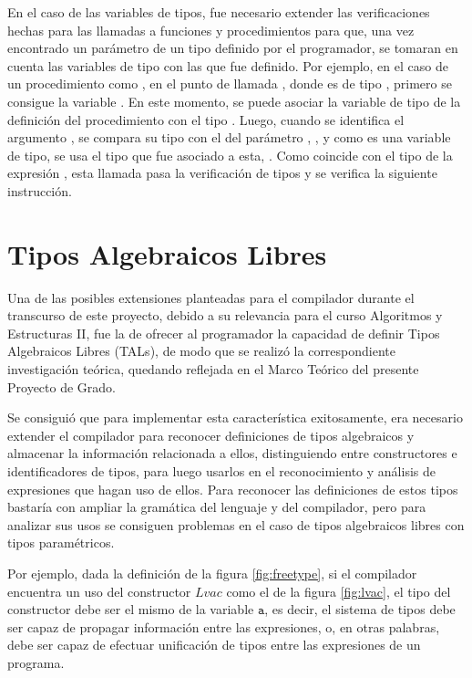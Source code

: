 {{En el caso de las variables de tipos, fue necesario extender las verificaciones
hechas para las llamadas a funciones y procedimientos para que, una vez
encontrado un parámetro de un tipo definido por el programador, se tomaran en
cuenta las variables de tipo con las que fue definido. Por ejemplo, en el caso
de un procedimiento como , en el punto
de llamada , donde  es de tipo
, primero se consigue la variable . En este
momento, se puede asociar la variable de tipo  de la definición del
procedimiento  con el tipo . Luego, cuando se
identifica el argumento , se compara su tipo con el del parámetro
, , y como es una variable de tipo, se usa el tipo que fue
asociado a esta, . Como coincide con el tipo de la expresión
, esta llamada pasa la verificación de tipos y se verifica la
siguiente instrucción.

\section{Tipos Algebraicos Libres}

Una de las posibles extensiones planteadas para el compilador durante el
transcurso de este proyecto, debido a su relevancia para el curso Algoritmos y
Estructuras II, fue la de ofrecer al programador la capacidad de definir Tipos
Algebraicos Libres (TALs), de modo que se realizó la correspondiente investigación
teórica, quedando reflejada en el Marco Teórico del presente Proyecto de Grado.

Se consiguió que para implementar esta característica exitosamente, era
necesario extender el compilador para reconocer definiciones de tipos
algebraicos y almacenar la información relacionada a ellos, distinguiendo entre
constructores e identificadores de tipos, para luego usarlos en el
reconocimiento y análisis de expresiones que hagan uso de ellos. Para reconocer
las definiciones de estos tipos bastaría con ampliar la gramática del lenguaje y
del compilador, pero para analizar sus usos se consiguen problemas en el caso de
tipos algebraicos libres con tipos paramétricos. 

Por ejemplo, dada la definición de la figura \ref{fig:freetype}, si el
compilador encuentra un uso del  constructor $Lvac$ como el de la figura
\ref{fig:lvac}, el tipo del constructor debe ser el mismo de la variable
$\texttt{a}$, es decir, el sistema de tipos debe ser capaz de propagar
información entre las expresiones, o, en otras palabras, debe ser capaz de
efectuar unificación de tipos entre las expresiones de un programa.

}}
